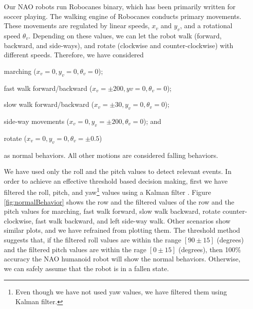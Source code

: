 \documentclass[letterpaper]{article}
\begin{document}
Our NAO robots run {\sf Robocanes} binary, which has been primarily written for soccer
playing. The walking engine of {\sf Robocanes} conducts primary movements. These movements are
regulated by linear speeds, $x_v$ and $y_v$, and a rotational speed $\theta_v$. Depending on these
values, we can let the robot walk (forward, backward, and side-ways), and rotate (clockwise and
counter-clockwise) with different speeds. Therefore, we have considered \begin{inparaenum}[(1)]
\item marching ($x_v = 0 , y_v = 0, \theta_v = 0$); \item fast walk forward/backward ($x_v = \pm200
, y v = 0, \theta_v = 0$); \item \item slow walk forward/backward ($x_v = \pm30 , y_v = 0, \theta_v
= 0$); \item side-way movements ($x_v = 0, y_v = \pm200, \theta_v = 0$); and  \item rotate
($x_v = 0 , y_v = 0, \theta_v = \pm 0.5$) \end{inparaenum} as normal behaviors. All other motions
are considered falling behaviors. 


We have used only the roll and the pitch values  to detect relevant events. In order to achieve an
effective threshold based decision making, first we have filtered the roll, pitch, and
yaw\footnote{Even though we have not used yaw values, we have filtered them using Kalman filter.}
values using a Kalman filter \cite{Welch:1995:IKF:897831}. Figure \ref{fig:normalBehavior} shows
the row and the filtered values of the row and the pitch values for marching, fast walk forward,
slow walk backward, rotate counter-clockwise, fast walk backward, and left side-way walk. Other
scenarios show similar plots, and we have refrained from plotting them. The threshold method
suggests that, if the filtered roll values are within the range $[90\pm15]$ (degrees) and the
filtered pitch values are within the rage $[0\pm15]$ (degrees), then 100\% accuracy the NAO humanoid
robot will show the normal behaviors. Otherwise, we can safely assume that the robot is in a fallen
state.   
\end{document}
